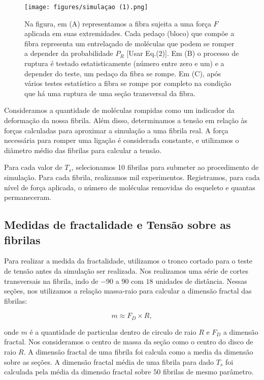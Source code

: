 \documentclass{report}
\begin{document}
        \begin{figure}[H]
            \centering
            \texttt{[image: figures/simulaçao (1).png]}
    
            \caption{Na figura, em (A) representamos a fibra sujeita a uma força $F$ aplicada em suas extremidades. Cada pedaço (bloco) que compõe 
            a fibra representa um entrelaçado de moléculas que podem se romper a depender da probabilidade $P_{R}$ [Usar Eq.(2)]. Em (B) o processo 
            de ruptura é testado estatisticamente (número entre zero e um) e a depender do teste, um pedaço da fibra se rompe. Em (C), após vários 
            testes estatístico a fibra se rompe por completo na condição que há uma ruptura de uma seção transversal da fibra.} 
    
            \label{M4}
        \end{figure}

      
        Consideramos a quantidade de moléculas rompidas como um indicador da deformação da nossa fibrila. Além disso, determinamos a tensão em relação 
        às forças calculadas para aproximar a simulação a uma fibrila real. A força necessária para romper uma ligação é considerada constante, e 
        utilizamos o diâmetro médio das fibrilas para calcular a tensão. 

        Para cada valor de \(T_{s}\), selecionamos 10 fibrilas para submeter ao procedimento de simulação. Para cada fibrila, realizamos mil 
        experimentos. Registramos, para cada nível de força aplicada, o número de moléculas removidas do esqueleto e quantas permaneceram. 
        
        \subsection{Medidas de fractalidade e Tensão sobre as fibrilas}

        Para realizar a medida da fractalidade, utilizamos o tronco cortado para o teste de tensão antes da simulação ser realizada. Nos 
        realizamos uma série de cortes transversais na fibrila, indo de \(-90\) a \(90\) com \(18\) unidades de distância. Nessas seções, 
        nos utilizamos a relação massa-raio para calcular a dimensão fractal das fibrilas:

        \begin{equation}
            m \approx F_{D} \times R,
        \end{equation}

        \noindent onde \(m\) é a quantidade de particulas dentro de circulo de raio \(R\) e \(F_{D}\) a dimensão fractal.
        Nos consideramos o centro de massa da seção como o centro do disco de raio \(R\). A dimensão fractal de uma fibrila
        foi calcula como a media da dimensão sobre as seções. A dimensão fractal média de uma fibrila para dado \(T_{s}\) foi 
        calculada pela média da dimensão fractal sobre \(50\) fibrilas de mesmo parâmetro.
\end{document}
